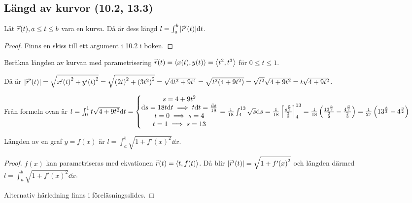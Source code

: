 \documentclass[a4paper]{article}
\begin{document}
\providecommand\fname{}
\renewcommand\fname{19-09-20}

\subsection{Längd av kurvor (10.2, 13.3)}
\begin{sats}
    Låt \(
        \accentset{\rightharpoonup}{r} (t), a \leq t \leq b
    \) vara en kurva. Då är dess längd \(
        l = \int_a^b \abs{\accentset{\rightharpoonup}{r}'(t)}\dd t
    \).

    \begin{proof}
        Finns en skiss till ett argument i 10.2 i boken.
    \end{proof}
\end{sats}

\begin{ex}
    Beräkna längden av kurvan med parametrisering \(
        \accentset{\rightharpoonup}{r} (t) = \left\langle x(t), y(t) \right\rangle = \left\langle t^2, t^3\right\rangle
    \) för \(
        0 \leq t \leq 1
    \).

    Då är \(
        \abs{\accentset{\rightharpoonup}{r}' (t)} 
        = \sqrt{{x'(t)}^2+{y'(t)}^2} 
        = \sqrt{ {(2t)}^2 + {(3t^2)}^2 }
        = \sqrt{ 4t^2+9t^4 }
        = \sqrt{ t^2(4+9t^2) }
        = \sqrt{t^2} \sqrt{4+9t^2}
        = t \sqrt{4+9t^2}
    \).

    Från formeln ovan är \(
        l = \int_0^1 t \sqrt{4+9t^2} \dd t 
        = \left\{\begin{matrix}
            s = 4+9t^2\\ 
            \dd s = 18t \dd t \implies t \dd t = \frac{\dd s}{18} \\ 
            t = 0 \implies s = 4\\ 
            t = 1 \implies s = 13
            \end{matrix}\right.
        = \frac{1}{18} \int_4^{13} \sqrt{s} \dd s
        = \frac{1}{18} \left[ \frac{s^{\frac{3}{2}}}{\frac{3}{2}} \right]_4^{13} 
        = \frac{1}{18} \left( \frac{{13}^{\frac{3}{2}}}{\frac{3}{2}} - \frac{4^{\frac{3}{2}}}{\frac{3}{2}}\right)
        = \frac{1}{27} \left( {13}^{\frac{3}{2}} - 4^{\frac{3}{2}}\right)
    \) 
\end{ex}

\begin{sats}
    Längden av en graf \(
        y = f(x)
    \) är \(
        l = \int_a^b \sqrt{1 + {f'(x)}^2} \dd x
    \). 
    \begin{proof}
        \(
            f(x)
        \)  kan parametriseras med ekvationen \(
            \accentset{\rightharpoonup}{r} (t) = \left\langle t, f(t) \right\rangle 
        \). Då blir \(
            \abs{\accentset{\rightharpoonup}{r} '(t)} = \sqrt{1 + {f'(x)}^2}
        \) och längden därmed \(
            l = \int_a^b \sqrt{1 + {f'(x)}^2} \dd x
        \).

        Alternativ härledning finns i föreläsningsslides.
    \end{proof}
\end{sats}
\end{document}
